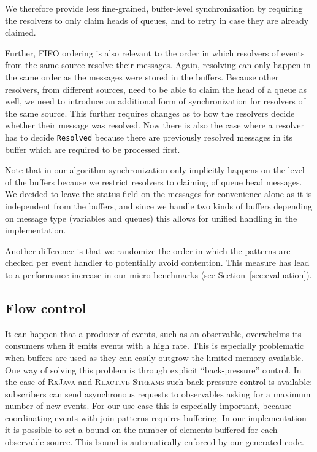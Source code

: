 \documentclass[runningheads]{llncs}
\begin{document}
\begin{sloppypar}
We therefore provide less fine-grained, buffer-level synchronization by
requiring the resolvers to only claim heads of queues, and to retry in case
they are already claimed.

Further, FIFO ordering is also relevant to the order in which resolvers of
events from the same source resolve their messages. Again, resolving can only
happen in the same order as the messages were stored in the buffers. Because
other resolvers, from different sources, need to be able to claim the head of
a queue as well, we need to introduce an additional form of synchronization
for resolvers of the same source. This further requires changes as to how the
resolvers decide whether their message was resolved. Now there is also the
case where a resolver has to decide \texttt{Resolved} because there are
previously resolved messages in its buffer which are required to be processed
first.

Note that in our algorithm synchronization only implicitly happens on the
level of the buffers because we restrict resolvers to claiming of queue head
messages. We decided to leave the status field on the messages for convenience
alone as it is independent from the buffers, and since we handle two kinds of
buffers depending on message type (variables and queues) this allows for
unified handling in the implementation.

Another difference is that we randomize the order in which the patterns are
checked per event handler to potentially avoid contention. This measure has
lead to a performance increase in our micro benchmarks (see
Section~\ref{sec:evaluation}).

\subsection{Flow control}\label{sec:flow}

It can happen that a producer of events, such as an observable, overwhelms its
consumers when it emits events with a high rate. This is especially
problematic when buffers are used as they can easily outgrow the limited
memory available. One way of solving this problem is through explicit ``back-pressure''
control. In the case of \textsc{RxJava} and \textsc{Reactive Streams} such back-pressure control
is available: subscribers can send asynchronous requests to
observables asking for a maximum number of new events. For our use case this is especially
important, because coordinating events with join patterns requires buffering. In our implementation it is possible to set a bound on the number of elements buffered for each observable source. This bound is automatically
enforced by our generated code.


\end{sloppypar}
\end{document}
